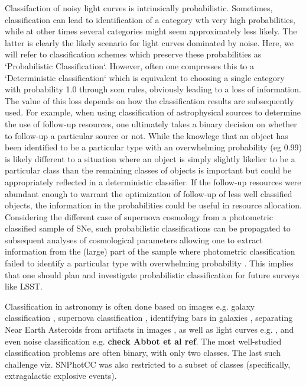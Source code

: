 Classifaction of noisy light curves is intrinsically probabilistic. Sometimes, classification can lead to identification of a category wth very high probabilities, while at other times several categories might seem approximately
less likely. The latter is clearly the likely scenario for light curves dominated by noise.
Here, we will refer to classification schemes which preserve these probabilities as `Probabilistic Classification`.
However, often one compresses this to a
 `Deterministic classification` which is equivalent to choosing a single category with probability 1.0 through som
rules, obviously leading to a loss of information. The value of this loss depends on how the classification results are subsequently used. For example, when using classification of astrophysical sources to determine the use of follow-up resources, one ultimately takes a binary decision on whether to follow-up a particular source or not. While the knowlege that an object has been identified to be a particular type with an overwhelming probability (eg 0.99) is likely different to a situation where an object is simply slightly likelier to be a particular class than the remaining classes of objects is important but could be appropriately reflected in a deterministic classifier. If the follow-up resources were abundant enough to warrant the optimization of follow-up of less well classified objects,  the information in the probabilities could be useful in resource allocation. Considering the different case of supernova cosmology from a photometric classified sample of SNe, such probabilistic classifications can be propagated to subsequent analyses of cosmological parameters allowing one to extract information from the (large) part of the sample where photometric classification failed to identify a particular type with overwhelming probability \cite{roberts_zbeams:_2017}. This implies that one should plan and investigate probabilistic classification for future surveys like LSST.

Classification in astronomy is often done based on images e.g.
galaxy classification \cite{2016A&C....16...34H}, supernova
classification \cite{2017ApJ...836...97C}, identifying bars in galaxies
\cite{2018MNRAS.477..894A}, separating Near Earth Asteroids from artifacts in images
\cite{2016PASJ...68..104M}, as well as light curves e.g. \cite{2016PASJ...68..104M,2017arXiv170906257M,2017CQGra..34f4003Z}, and even noise classification e.g. \textbf{check Abbot et al ref}\cite{2017CQGra..34f4003Z,2018PhRvD..97j1501G}.
The most well-studied classification problems are often binary, with only two classes.
The last such challenge viz. SNPhotCC was also restricted to a subset of classes (specifically, extragalactic explosive events).

